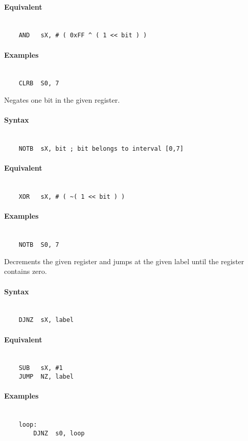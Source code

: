     \paragraph{Equivalent}
        ~\\
        \verb'    AND   sX, # ( 0xFF ^ ( 1 << bit ) )'

    \paragraph{Examples}
        ~\\
        \verb'    CLRB  S0, 7'

    Negates one bit in the given register.

    \paragraph{Syntax}
        ~\\
        \verb'    NOTB  sX, bit ; bit belongs to interval [0,7]'

    \paragraph{Equivalent}
        ~\\
        \verb'    XOR   sX, # ( ~( 1 << bit ) )'

    \paragraph{Examples}
        ~\\
        \verb'    NOTB  S0, 7'

    Decrements the given register and jumps at the given label until the register contains zero.

    \paragraph{Syntax}
        ~\\
        \verb'    DJNZ  sX, label'

    \paragraph{Equivalent}
        ~\\
        \verb'    SUB   sX, #1'\\
        \verb'    JUMP  NZ, label'

    \paragraph{Examples}
        ~\\
        \verb'    loop:             '\\
        \verb'        DJNZ  s0, loop'

